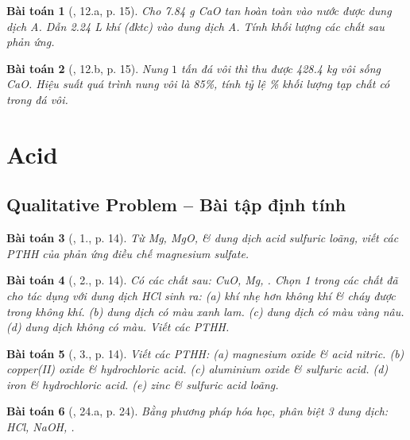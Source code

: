 \documentclass{article}
\newtheorem{baitoan}{Bài toán}
\begin{document}
\begin{baitoan}[\cite{An_350_BT_Hoa_Hoc_9}, 12.a, p. 15]
	Cho \emph{7.84 g CaO} tan hoàn toàn vào nước được dung dịch A. Dẫn \emph{2.24 L} khí \emph{} (đktc) vào dung dịch A. Tính khối lượng các chất sau phản ứng.
\end{baitoan}

\begin{baitoan}[\cite{An_350_BT_Hoa_Hoc_9}, 12.b, p. 15]
	Nung $1$ tấn đá vôi thì thu được \emph{428.4 kg} vôi sống \emph{CaO}. Hiệu suất quá trình nung vôi là \emph{85\%}, tính tỷ lệ \emph{\%} khối lượng tạp chất có trong đá vôi.
\end{baitoan}


\section{Acid}

\subsection{Qualitative Problem -- Bài tập định tính}

\begin{baitoan}[\cite{SGK_Hoa_Hoc_9}, 1., p. 14]
	Từ \emph{Mg, MgO, } \& dung dịch acid sulfuric loãng, viết các PTHH của phản ứng điều chế magnesium sulfate.
\end{baitoan}

\begin{baitoan}[\cite{SGK_Hoa_Hoc_9}, 2., p. 14]
	Có các chất sau: \emph{CuO, Mg, }. Chọn 1 trong các chất đã cho tác dụng với dung dịch \emph{HCl} sinh ra: (a) khí nhẹ hơn không khí \& cháy được trong không khí. (b) dung dịch có màu xanh lam. (c) dung dịch có màu vàng nâu. (d) dung dịch không có màu. Viết các PTHH.
\end{baitoan}

\begin{baitoan}[\cite{SGK_Hoa_Hoc_9}, 3., p. 14]
	Viết các PTHH: (a) magnesium oxide \& acid nitric. (b) copper(II) oxide \& hydrochloric acid. (c) aluminium oxide \& sulfuric acid. (d) iron \& hydrochloric acid. (e) zinc \& sulfuric acid loãng.
\end{baitoan}

\begin{baitoan}[\cite{An_350_BT_Hoa_Hoc_9}, 24.a, p. 24]
	Bằng phương pháp hóa học, phân biệt 3 dung dịch: \emph{HCl, NaOH, }.
\end{baitoan}
\end{document}
